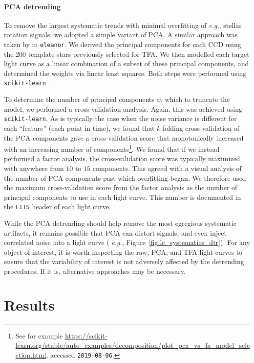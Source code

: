 \documentclass[12pt,twocolumn,tighten,trackchanges]{aastex62}
\begin{document}
\paragraph{PCA detrending}

To remove the largest systematic trends with minimal overfitting of
{\it e.g.}, stellar rotation signals, we adopted a simple variant of
PCA.  A similar approach was taken by \citet{feinstein_eleanor_2019}
in \texttt{eleanor}.  We derived the principal components for each CCD
using the 200 template stars previously selected for TFA.  We then
modelled each target light curve as a linear combination of a subset
of these principal components, and determined the weights via linear
least squares. Both steps were performed using \texttt{scikit-learn}
\citep{sklearn_2011}.

To determine the number of principal components at which to truncate
the model, we performed a cross-validation analysis.  Again, this was
achieved using \texttt{scikit-learn}.  As is typically the case when
the noise variance is different for each ``feature'' (each point in
time), we found that $k$-folding cross-validation of the PCA
components gave a cross-validation score that monotonically increased
with an increasing number of components\footnote{See for example
\url{https://scikit-learn.org/stable/auto_examples/decomposition/plot_pca_vs_fa_model_selection.html}, accessed \texttt{2019-08-06}.}.  We found that if we instead performed a factor
analysis, the cross-validation score was typically maximized with
anywhere from $10$ to $15$ components.  This agreed with a visual
analysis of the number of PCA components past which overfitting began.
We therefore used the maximum cross-validation score from the factor
analysis as the number of principal components to use in each light
curve.  This number is documented in the \texttt{FITS} header of each
light curve.

While the PCA detrending should help remove the most egregious
systematic artifacts, it remains possible that PCA can distort
signals, and even inject correlated noise into a light curve ({\it
e.g.}, Figure~\ref{fig:lc_systematics_dtr}).  For any object of
interest, it is worth inspecting the raw, PCA, and TFA light curves to
ensure that the variability of interest is not adversely affected by
the detrending procedures.  If it is, alternative approaches may be
necessary.


\section{Results}
\label{sec:results}
\end{document}
